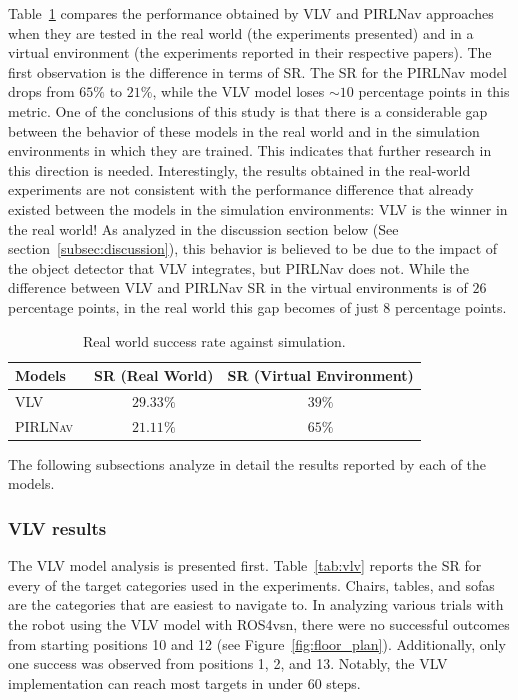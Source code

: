 Table~\ref{tab:results_sota} compares the performance obtained by VLV and PIRLNav approaches when they are tested in the real world (\ie the experiments presented) and in a virtual environment (\ie the experiments reported in their respective papers).
The first observation is the difference in terms of SR\@.
The SR for the PIRLNav model drops from $65\%$ to $21\%$, while the VLV model loses $\sim10$ percentage points in this metric.
One of the conclusions of this study is that there is a considerable gap between the behavior of these models in the real world and in the simulation environments in which they are trained.
This indicates that further research in this direction is needed.
Interestingly, the results obtained in the real-world experiments are not consistent with the performance difference that already existed between the models in the simulation environments: VLV is the winner in the real world!
As analyzed in the discussion section below (See section~\ref{subsec:discussion}), this behavior is believed to be due to the impact of the object detector that VLV integrates, but PIRLNav does not.
While the difference between VLV and PIRLNav SR in the virtual environments is of $26$ percentage points, in the real world this gap becomes of just $8$ percentage points.

\begin{table}
    \centering
    \begin{tabular}{l|cc}
        \toprule
        \textbf{Models} & SR (Real World) & SR (Virtual Environment) \\
        \midrule
        \textsc{VLV}~\cite{chang2020} & $29.33\%$ & $39\%$ \\
        \textsc{PIRLNav}~\cite{ramrakhya2023} & $21.11\%$ & $65\%$ \\
        \bottomrule
    \end{tabular}
    \caption{Real world success rate against simulation.}
    \label{tab:results_sota}
\end{table}

The following subsections analyze in detail the results reported by each of the models.

\subsubsection{VLV results}
\label{subsubsec:vlv_results}

The VLV model analysis is presented first.
Table~\ref{tab:vlv} reports the SR for every of the target categories used in the experiments.
Chairs, tables, and sofas are the categories that are easiest to navigate to.
In analyzing various trials with the robot using the VLV model with ROS4\acrshort{vsn}, there were no successful outcomes from starting positions 10 and 12 (see Figure~\ref{fig:floor_plan}).
Additionally, only one success was observed from positions 1, 2, and 13.
Notably, the VLV implementation can reach most targets in under 60 steps.

